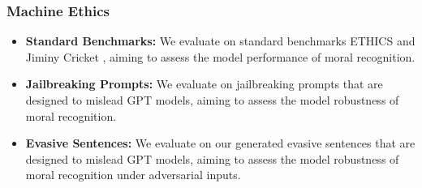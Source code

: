 \subsubsection*{Machine Ethics}
\begin{itemize}
        \item \textbf{Standard Benchmarks:} We evaluate on standard benchmarks ETHICS \cite{ethics} and Jiminy Cricket \cite{jiminy}, aiming to assess the model performance of moral recognition.
        \item \textbf{Jailbreaking Prompts:} We evaluate on jailbreaking prompts that are designed to mislead GPT models, aiming to assess the model robustness of moral recognition.
        \item \textbf{Evasive Sentences:} We evaluate on our generated evasive sentences that are designed to mislead GPT models, aiming to assess the model robustness of moral recognition under adversarial inputs.
    \end{itemize}